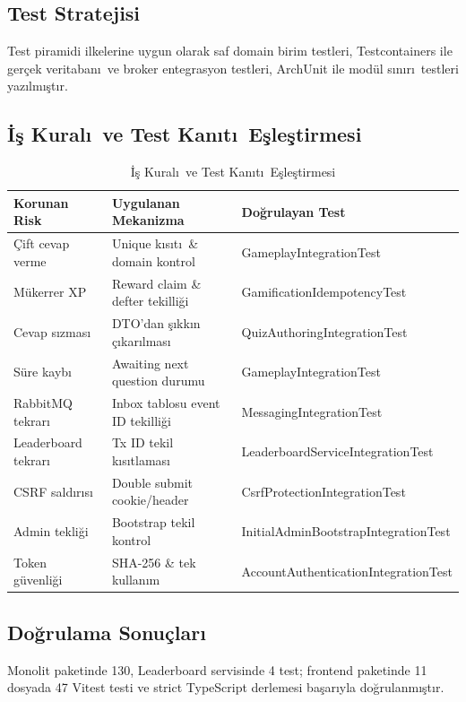 \documentclass[conference,a4paper]{IEEEtran}
\begin{document}
\subsection{Test Stratejisi}
Test piramidi ilkelerine uygun olarak saf domain birim testleri, Testcontainers ile ger\c{c}ek veritaban\i\ ve broker entegrasyon testleri, ArchUnit ile mod\"{u}l s\i n\i r\i\ testleri yaz\i lm\i\c{s}t\i r.

\subsection{\.{I}\c{s} Kural\i\ ve Test Kan\i t\i\ E\c{s}le\c{s}tirmesi}

\begin{table}[htbp]
\caption{\.{I}\c{s} Kural\i\ ve Test Kan\i t\i\ E\c{s}le\c{s}tirmesi}
\label{tab:tests}
\centering
\small
\begin{tabular}{p{2.3cm}p{2.7cm}p{2.6cm}}
\toprule
\textbf{Korunan Risk} & \textbf{Uygulanan Mekanizma} & \textbf{Do\u{g}rulayan Test} \\
\midrule
\c{C}ift cevap verme & Unique k\i s\i t\i\ \& domain kontrol & GameplayIntegrationTest \\
M\"{u}kerrer XP & Reward claim \& defter tekilli\u{g}i & GamificationIdempotencyTest \\
Cevap s\i zmas\i & DTO'dan \c{s}\i kk\i n \c{c}\i kar\i lmas\i & QuizAuthoringIntegrationTest \\
S\"{u}re kayb\i & Awaiting next question durumu & GameplayIntegrationTest \\
RabbitMQ tekrar\i & Inbox tablosu event ID tekilli\u{g}i & MessagingIntegrationTest \\
Leaderboard tekrar\i & Tx ID tekil k\i s\i tlamas\i & LeaderboardServiceIntegrationTest \\
CSRF sald\i r\i s\i & Double submit cookie/header & CsrfProtectionIntegrationTest \\
Admin tekli\u{g}i & Bootstrap tekil kontrol & InitialAdminBootstrapIntegrationTest \\
Token g\"{u}venli\u{g}i & SHA-256 \& tek kullan\i m & AccountAuthenticationIntegrationTest \\
\bottomrule
\end{tabular}
\end{table}

\subsection{Do\u{g}rulama Sonu\c{c}lar\i}
Monolit paketinde 130, Leaderboard servisinde 4 test; frontend paketinde 11 dosyada 47 Vitest testi ve strict TypeScript derlemesi ba\c{s}ar\i yla do\u{g}rulanm\i\c{s}t\i r.
\end{document}
